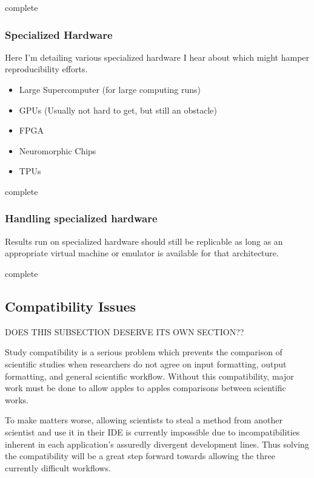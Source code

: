 \documentclass[american]{article}
\newcommand{\complete}{
	\gls{complete}
}
\begin{document}
\complete

\subsubsection{Specialized Hardware} \label{sec:repro-spec-hardware}

Here I'm detailing various specialized hardware I hear about which might hamper reproducibility efforts.

\begin{itemize}
\item Large Supercomputer (for large computing runs)
\item GPUs (Usually not hard to get, but still an obstacle)
\item FPGA
\item Neuromorphic Chips \cite{neuromorphic-chips-webarticle}
\item TPUs \cite{jouppi-tpu-performance-2017}
\end{itemize}

\complete

\subsubsection{Handling specialized hardware} \label{sec:repro-spec-hardware-handling}

Results run on specialized hardware should still be replicable as long as an appropriate virtual machine or emulator is available for that architecture.

\complete

\subsection{Compatibility Issues} \label{sec:repro-compatibility-issues}

DOES THIS SUBSECTION DESERVE ITS OWN SECTION??

Study compatibility is a serious problem which prevents the comparison of scientific studies when researchers do not agree on input formatting, output formatting, and general scientific workflow. Without this compatibility, major work must be done to allow apples to apples comparisons between scientific works.

To make matters worse, allowing scientists to steal a method from another scientist and use it in their IDE is currently impossible due to incompatibilities inherent in each application's assuredly divergent development lines. Thus solving the compatibility will be a great step forward towards allowing the three currently difficult workflows.
\end{document}
